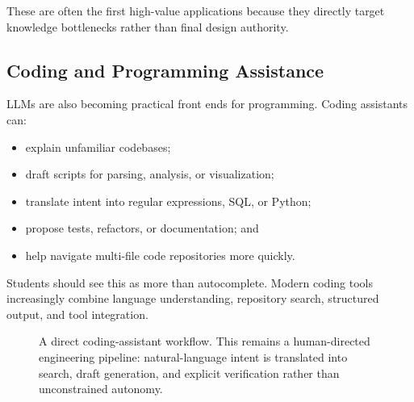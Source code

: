 \documentclass[12pt]{article}
\begin{document}
These are often the first high-value applications because they directly target knowledge bottlenecks rather than final design authority.

\subsection{Coding and Programming Assistance}

LLMs are also becoming practical front ends for programming. Coding assistants can:
\begin{itemize}
    \item explain unfamiliar codebases;
    \item draft scripts for parsing, analysis, or visualization;
    \item translate intent into regular expressions, SQL, or Python;
    \item propose tests, refactors, or documentation; and
    \item help navigate multi-file code repositories more quickly.
\end{itemize}

Students should see this as more than autocomplete. Modern coding tools increasingly combine language understanding, repository search, structured output, and tool integration.

\begin{figure}[ht]
    \centering
    \caption{A direct coding-assistant workflow. This remains a human-directed engineering pipeline: natural-language intent is translated into search, draft generation, and explicit verification rather than unconstrained autonomy.}
    \label{t16fig:coding_workflow}
\end{figure}
\end{document}
